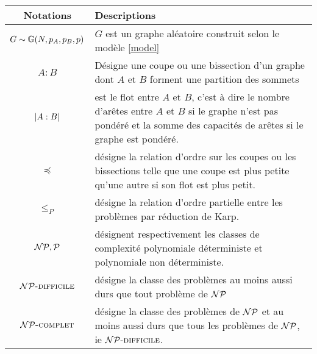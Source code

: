 \documentclass{standalone}
\begin{document}
	\centering
\begin{tabularx}{\textwidth}{|c|X|}
	\hline
	Notations & Descriptions \\
	\hline
	$G \sim \mathbb G(N, p_A, p_B, p)$ & $G$ est un graphe aléatoire construit selon le modèle \ref{model}  \\
	\hline
	$A:B$ & Désigne une coupe ou une bissection d'un graphe dont $A$ et $B$ forment une partition des sommets \\
	\hline
	$\left| A:B\right|$ & est le flot entre $A$ et $B$, c'est à dire le nombre d'arêtes entre $A$ et $B$ si le graphe n'est pas pondéré et la somme des capacités de arêtes si le graphe est pondéré. \\
		\hline
	$\preceq$ & désigne la relation d'ordre sur les coupes ou les bissections telle que une coupe est plus petite qu'une autre si son flot est plus petit. \\
		\hline
	$\leq_P$ & désigne la relation d'ordre partielle entre les problèmes par réduction de Karp\cite{21karp}. \\
		\hline
	$\mathcal{NP}, \mathcal{P}$ & désignent respectivement les classes de complexité polynomiale déterministe et polynomiale non déterministe. \\
		\hline
	$\mathcal{NP}\text{\textsc{-difficile}}$ & désigne la classe des problèmes au moins aussi durs que tout problème de $\mathcal{NP}$ \\
		\hline
	$\mathcal{NP}\text{\textsc{-complet}}$ & désigne la classe des problèmes de $\mathcal{NP}$ et au moins aussi durs que tous les problèmes de $\mathcal{NP}$, ie $\mathcal{NP}\text{\textsc{-difficile}}$. \\
		\hline
\end{tabularx}
\end{document}
